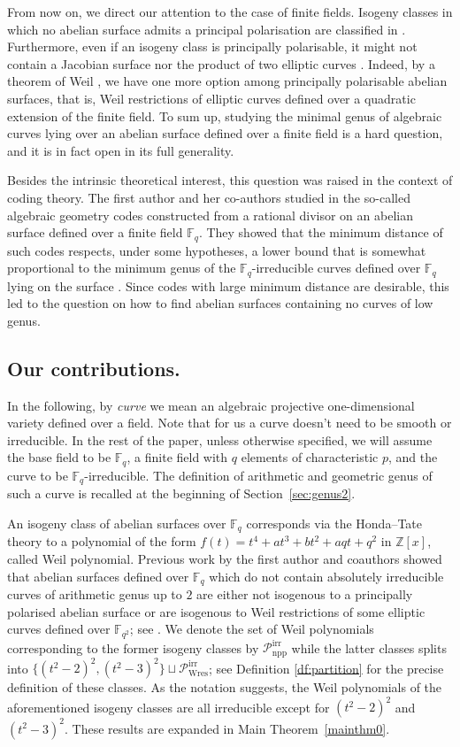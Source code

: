 \documentclass[11pt]{amsart}
\newcommand\Fq{\mathbb{F}_q}
\newcommand\Z{\mathbb{Z}}
\theoremstyle{plain}
\theoremstyle{definition}
\newcommand\PirrA{\mathcal{P}^\mathrm{irr}_\mathrm{npp}}
\newcommand\PirrB{\mathcal{P}^\mathrm{irr}_\mathrm{Wres}}
\begin{document}
From now on, we direct our attention to the case of finite fields. Isogeny classes in which no abelian surface admits a principal polarisation are classified in \cite{HMNR08}. Furthermore, even if an isogeny class is principally polarisable, it might not contain a Jacobian surface nor the product of two elliptic curves \cite{HNR09}. Indeed, by a theorem of Weil \cite[Thm.~1.3]{HNR09}, we have one more option among principally polarisable abelian surfaces, that is, Weil restrictions of elliptic curves defined over a quadratic extension of the finite field.  To sum up,  studying the minimal genus of algebraic curves lying over an abelian surface defined over a finite field is a hard question, and it is in fact open in its full generality.

Besides the intrinsic theoretical interest, this question was raised in the context of coding theory. The first author and her co-authors studied in \cite{MYFE1} the so-called algebraic geometry codes constructed from a rational divisor on an abelian surface defined over a finite field $\Fq$. They showed that the minimum distance of such codes respects, under some hypotheses, a lower bound that is somewhat proportional to the minimum genus of the $\Fq$-irreducible curves defined over $\Fq$ lying on the surface \cite[Thm.~3.3 and Rmk.~3.6]{MYFE1}. Since codes with large minimum distance are desirable, this led to the question on how to find abelian surfaces containing no curves of low genus.

\subsection*{Our contributions.}
In the following, by \emph{curve} we mean an algebraic projective one-dimensional variety defined over a field. 
Note that for us a curve doesn't need to be smooth or irreducible.
In the rest of the paper, unless otherwise specified, we will assume the base field to be $\Fq$, a finite field with $q$ elements of characteristic $p$, and the curve to be $\Fq$-irreducible.
The definition of arithmetic and geometric genus of such a curve is recalled at the beginning of Section~\ref{sec:genus2}.

An isogeny class of abelian surfaces over $\Fq$ corresponds via the Honda--Tate theory to a polynomial of the form $f(t)=t^4+at^3+bt^2+aqt+q^2$ in $\Z[x]$, called Weil polynomial. 
Previous work by the first author and coauthors showed that abelian surfaces defined over $\Fq$ which do not contain absolutely irreducible curves of arithmetic genus up to $2$ are either not isogenous to a principally polarised abelian surface or are isogenous to Weil restrictions of some elliptic curves defined over $\mathbb{F}_{q^2}$; see \cite[Prop.~4.2 and 4.3]{MYFE1}.  
We denote the set of Weil polynomials corresponding to the former isogeny classes by $\PirrA$ while the latter classes splits into $\{ (t^2-2)^2 , (t^2-3)^2 \} \sqcup\PirrB$; see Definition \ref{df:partition} for the precise definition of these classes. 
As the notation suggests, the Weil polynomials of the aforementioned isogeny classes are all irreducible except for $(t^2-2)^2$ and $(t^2-3)^2$.
These results are expanded in Main Theorem~\ref{mainthm0}.
\end{document}
